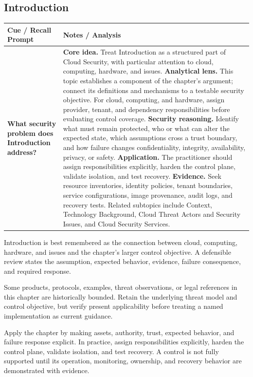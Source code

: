 \documentclass[11pt]{article}
\newcommand{\CornellHeader}{%
\rowcolor{Navy}\color{white}\bfseries Cue / Recall Prompt & \color{white}\bfseries Notes / Analysis\\\hline}
\newcommand{\CornellRow}[2]{%
\cellcolor{CueGray}\RaggedRight\textbf{#1} & \RaggedRight #2\\\hline}
\begin{document}
\subsection*{Introduction}
\begin{longtable}{>{\RaggedRight\arraybackslash}p{}|>{\RaggedRight\arraybackslash}p{}}
\CornellHeader
\CornellRow{What security problem does Introduction address?}{\textbf{Core idea.} Treat Introduction as a structured part of Cloud Security, with particular attention to cloud, computing, hardware, and issues. \textbf{Analytical lens.} This topic establishes a component of the chapter's argument; connect its definitions and mechanisms to a testable security objective. For cloud, computing, and hardware, assign provider, tenant, and dependency responsibilities before evaluating control coverage. \textbf{Security reasoning.} Identify what must remain protected, who or what can alter the expected state, which assumptions cross a trust boundary, and how failure changes confidentiality, integrity, availability, privacy, or safety. \textbf{Application.} The practitioner should assign responsibilities explicitly, harden the control plane, validate isolation, and test recovery. \textbf{Evidence.} Seek resource inventories, identity policies, tenant boundaries, service configurations, image provenance, audit logs, and recovery tests. Related subtopics include Context, Technology Background, Cloud Threat Actors and Security Issues, and Cloud Security Services.}
\end{longtable}
\begin{topicsummary}
Introduction is best remembered as the connection between cloud, computing, hardware, and issues and the chapter's larger control objective. A defensible review states the assumption, expected behavior, evidence, failure consequence, and required response.
\end{topicsummary}
\begin{historybox}
Some products, protocols, examples, threat observations, or legal references in this chapter are historically bounded. Retain the underlying threat model and control objective, but verify present applicability before treating a named implementation as current guidance.
\end{historybox}
\begin{defensebox}
Apply the chapter by making assets, authority, trust, expected behavior, and failure response explicit. In practice, assign responsibilities explicitly, harden the control plane, validate isolation, and test recovery. A control is not fully supported until its operation, monitoring, ownership, and recovery behavior are demonstrated with evidence.
\end{defensebox}
\end{document}
